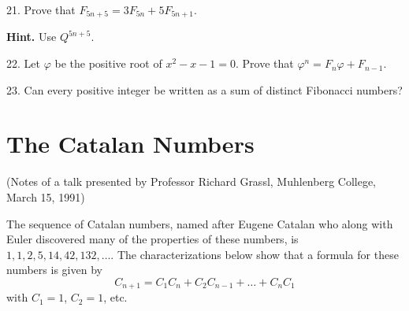 \documentclass[10pt,]{book}
\theoremstyle{plain}
\theoremstyle{definition}
\theoremstyle{definition}
\numberwithin{equation}{chapter}
\begin{document}
\begin{exerciselist}
\par\smallskip
\item[21.]\hypertarget{exercise-21}{}\hypertarget{p-49}{}%
Prove that \(F_{5n + 5} = 3F_{5n} + 5F_{5n + 1}\).%
\par\smallskip
\par\smallskip%
\noindent\textbf{Hint.}\hypertarget{hint-2}{}\quad%
\hypertarget{p-50}{}%
Use \(Q^{5n + 5}\).%
\item[22.]\hypertarget{exercise-22}{}\hypertarget{p-51}{}%
Let \(\varphi\) be the positive root of \(x^{2} - x - 1 = 0\). Prove that \(\varphi^{n} = F_{n}\varphi + F_{n - 1}\).%
\par\smallskip
\item[23.]\hypertarget{exercise-23}{}\hypertarget{p-52}{}%
Can every positive integer be written as a sum of distinct Fibonacci numbers?%
\par\smallskip
\end{exerciselist}
\typeout{************************************************}
\typeout{************************************************}
\chapter[{The Catalan Numbers}]{The Catalan Numbers}\label{ch_catalan}
\hypertarget{p-53}{}%
(Notes of a talk presented by Professor Richard Grassl, Muhlenberg College, March 15, 1991)%
\par
\hypertarget{p-54}{}%
The sequence of Catalan numbers, named after Eugene Catalan who along with Euler discovered many of the properties of these numbers, is \(1, 1, 2, 5, 14, 42, 132, \ldots\). The characterizations below show that a formula for these numbers is given by%
\begin{equation*}
C_{n + 1} = C_{1}C_{n} + C_{2}C_{n - 1} + \ldots + C_{n}C_{1}
\end{equation*}
with \(C_1 = 1\), \(C_2 = 1\), etc.%
\typeout{************************************************}
\typeout{************************************************}
\end{document}
